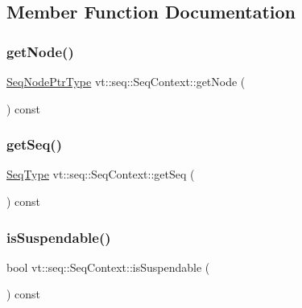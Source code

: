 \subsection{Member Function Documentation}
\mbox{\label{structvt_1_1seq_1_1_seq_context_a9fd5265c51699de8e5a33e297333bd45}} 
\subsubsection{\texorpdfstring{get\+Node()}{getNode()}}
{\footnotesize\ttfamily \hyperlink{namespacevt_1_1seq_ae6a4874b585be0612aaca32ca6d2d191}{Seq\+Node\+Ptr\+Type} vt\+::seq\+::\+Seq\+Context\+::get\+Node (\begin{DoxyParamCaption}{ }\end{DoxyParamCaption}) const}

\mbox{\label{structvt_1_1seq_1_1_seq_context_a24fb30ec00c71ae6ae51ba6931957f2a}} 
\subsubsection{\texorpdfstring{get\+Seq()}{getSeq()}}
{\footnotesize\ttfamily \hyperlink{namespacevt_1_1seq_a3b612da217ac669d39c159f134ab8434}{Seq\+Type} vt\+::seq\+::\+Seq\+Context\+::get\+Seq (\begin{DoxyParamCaption}{ }\end{DoxyParamCaption}) const}

\mbox{\label{structvt_1_1seq_1_1_seq_context_a5ad2faf1024f75aee49020194022a831}} 
\subsubsection{\texorpdfstring{is\+Suspendable()}{isSuspendable()}}
{\footnotesize\ttfamily bool vt\+::seq\+::\+Seq\+Context\+::is\+Suspendable (\begin{DoxyParamCaption}{ }\end{DoxyParamCaption}) const}

